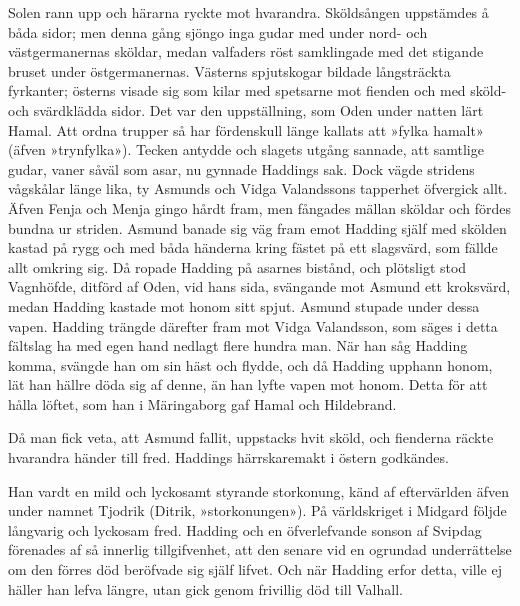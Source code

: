 Solen rann upp och härarna ryckte mot hvarandra. Sköldsången uppstämdes
å båda sidor; men denna gång sjöngo inga gudar med under nord- och
västgermanernas sköldar, medan valfaders röst samklingade med det
stigande bruset under östgermanernas. Västerns spjutskogar bildade
långsträckta fyrkanter; österns visade sig som kilar med spetsarne mot
fienden och med sköld- och svärdklädda sidor. Det var den uppställning,
som Oden under natten lärt Hamal. Att ordna trupper så har fördenskull
länge kallats att »fylka hamalt» (äfven »trynfylka»). Tecken antydde och
slagets utgång sannade, att samtlige gudar, vaner såväl som asar, nu
gynnade Haddings sak. Dock vägde stridens vågskålar länge lika, ty
Asmunds och Vidga Valandssons tapperhet öfvergick allt. Äfven Fenja och
Menja gingo hårdt fram, men fångades mällan sköldar och fördes bundna ur
striden. Asmund banade sig väg fram emot Hadding själf med skölden
kastad på rygg och med båda händerna kring fästet på ett slagsvärd, som
fällde allt omkring sig. Då ropade Hadding på asarnes bistånd, och
plötsligt stod Vagnhöfde, ditförd af Oden, vid hans sida, svängande mot
Asmund ett kroksvärd, medan Hadding kastade mot honom sitt spjut. Asmund
stupade under
\protect\hypertarget{lb1625905.xhtmlux5cux23start167}{}{}\protect\hypertarget{lb1625905.xhtmlux5cux23start167-a}{}{}\protect\hypertarget{lb1625905.xhtmlux5cux23start167-b}{}{}\protect\hypertarget{lb1625905.xhtmlux5cux23start167-c}{}{}\protect\hypertarget{lb1625905.xhtmlux5cux23start167-d}{}{}
dessa vapen. Hadding trängde därefter fram mot Vidga Valandsson, som
säges i detta fältslag ha med egen hand nedlagt flere hundra man. När
han såg Hadding komma, svängde han om sin häst och flydde, och då
Hadding upphann honom, lät han hällre döda sig af denne, än han lyfte
vapen mot honom. Detta för att hålla löftet, som han i Märingaborg gaf
Hamal och Hildebrand.

Då man fick veta, att Asmund fallit, uppstacks hvit sköld, och fienderna
räckte hvarandra händer till fred. Haddings härrskaremakt i östern
godkändes.

Han vardt en mild och lyckosamt styrande storkonung, känd af
eftervärlden äfven under namnet Tjodrik (Ditrik, »storkonungen»). På
världskriget i Midgard följde långvarig och lyckosam fred. Hadding och
en öfverlefvande sonson af Svipdag förenades af så innerlig
tillgifvenhet, att den senare vid en ogrundad underrättelse om den
förres död beröfvade sig själf lifvet. Och när Hadding erfor detta,
ville ej häller han lefva längre, utan gick genom frivillig död till
Valhall.

